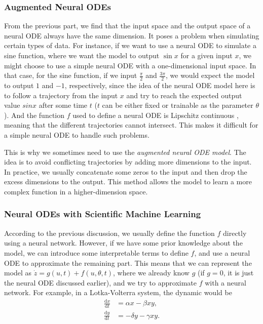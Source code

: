 \documentclass[a4paper,11pt,titlepage]{article}
\theoremstyle{definition}
\theoremstyle{plain}
\theoremstyle{remark}
\begin{document}
\subsubsection{Augmented Neural ODEs}

From the previous part, we find that the input space and the output space of a neural ODE always have the same dimension. It poses a problem when simulating certain types of data. For instance, if we want to use a neural ODE to simulate a sine function, where we want the model to output $\sin x$ for a given input $x$, we might choose to use a simple neural ODE with a one-dimensional input space. In that case, for the sine function, if we input $\frac{\pi}{2}$ and $\frac{3\pi}{2}$, we would expect the model to output $1$ and $-1$, respectively, since the idea of the neural ODE model here is to follow a trajectory from the input $x$ and try to reach the expected output value $sinx$ after some time $t$ ($t$ can be either fixed or trainable as the parameter $\theta$). And the function $f$ used to define a neural ODE is Lipschitz continuous \cite{chen2018neural}, meaning that the different trajectories cannot intersect. This makes it difficult for a simple neural ODE to handle such problems.

This is why we sometimes need to use the \textit{augmented neural ODE model}. The idea is to avoid conflicting trajectories by adding more dimensions to the input. In practice, we usually concatenate some zeros to the input and then drop the excess dimensions to the output. This method allows the model to learn a more complex function in a higher-dimension space.

\subsubsection{Neural ODEs with Scientific Machine Learning}

According to the previous discussion, we usually define the function $f$ directly using a neural network. However, if we have some prior knowledge about the model, we can introduce some interpretable terms to define $f$, and use a neural ODE to approximate the remaining part. This means that we can represent the model as $\dot{z}=g(u,t)+f(u,\theta,t)$, where we already know $g$ (if $g=0$, it is just the neural ODE discussed earlier), and we try to approximate $f$ with a neural network. For example, in a Lotka-Volterra system, the dynamic would be
\begin{align*}
    \frac{\mathrm{d}x}{\mathrm{d}t}&=\alpha x-\beta xy,\\
    \frac{\mathrm{d}y}{\mathrm{d}t}&=-\delta y-\gamma xy.
\end{align*}
\end{document}
